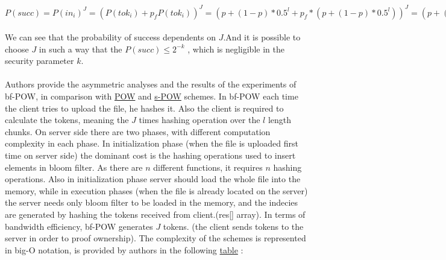 \documentclass[12pt]{article}
\begin{document}
$P(succ)=P(in_i)^J=(P(tok_i)+p_fP(tok_i))^J=(p+(1-p)*0.5^l + p_f*(p+(1-p)*0.5^l))^J=(p+(1-p)*0.5^l)+p_f(1-p)(1-0.5^l)^J=(p+(1-p)(0.5^l)+p_f(1-0.5^l))^J$\\\\
We can see that the probability   of success dependents on $J$.And it is possible to choose $J$ in such a way that the $P(succ) \leq 2^{-k}$ , which is negligible in the security parameter $k$.\\\\
Authors provide the asymmetric analyses and the results of the experiments of bf-POW, in comparison with \hyperref[sub:Soltuion1]{POW} and \hyperref[sub:Soltuion2]{s-POW} schemes. In bf-POW each time the client tries to upload the file, he hashes it. Also the client is required to calculate the tokens, meaning the $J$ times hashing operation over the $l$ length chunks. On server side there are two phases, with different computation complexity in each phase. In initialization phase (when the file is uploaded first time on server side) the dominant cost is the hashing operations used to insert elements in bloom filter. As there are $n$ different functions, it requires $n$ hashing operations. Also in initialization phase server should load the whole file into the memory, while in execution phases (when the file is already located on the server) the server needs only bloom filter to be loaded in the memory, and the indecies are generated by hashing the tokens received from client.(res[] array). In terms of bandwidth efficiency, bf-POW generates $J$ tokens. (the client sends tokens to the server in order to proof ownership). 
The complexity of the schemes is represented in big-O notation, is provided by authors in the following  \hyperref[table:asymptoticAnalysisBF-POW]{table} : 
\end{document}
